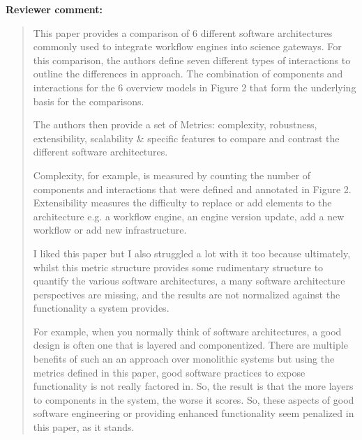 \documentclass[a4]{article}
\newenvironment{review}%
{\textbf{Reviewer comment:}\begin{quote}}%
{\end{quote}}%
\begin{document}
\begin{review}
  This paper provides a comparison of 6 different software
  architectures commonly used to integrate workflow engines into
  science gateways. For this comparison, the authors define seven
  different types of interactions to outline the differences in
  approach. The combination of components and interactions for the 6
  overview models in Figure 2 that form the underlying basis for the
  comparisons.

  The authors then provide a set of Metrics: complexity, robustness,
  extensibility, scalability \& specific features to compare and
  contrast the different software architectures.

  Complexity, for example, is measured by counting the number of
  components and interactions that were defined and annotated in
  Figure 2.  Extensibility measures the difficulty to replace or add
  elements to the architecture e.g. a workflow engine, an engine
  version update, add a new workflow or add new infrastructure.

  I liked this paper but I also struggled a lot with it too because
  ultimately, whilst this metric structure provides some rudimentary
  structure to quantify the various software architectures, a many
  software architecture perspectives are missing, and the results are
  not normalized against the functionality a system provides.

  For example, when you normally think of software architectures, a
  good design is often one that is layered and componentized. There
  are multiple benefits of such an an approach over monolithic systems
  but using the metrics defined in this paper, good software practices
  to expose functionality is not really factored in. So, the result is
  that the more layers to components in the system, the worse it
  scores. So, these aspects of good software engineering or providing
  enhanced functionality seem penalized in this paper, as it stands.
\end{review}
\end{document}
